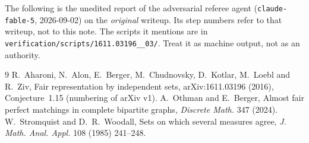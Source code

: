 \documentclass[11pt,a4paper]{article}
\theoremstyle{plain}
\theoremstyle{definition}
\theoremstyle{remark}
\begin{document}
\begin{tcolorbox}[colback=gray!8,colframe=gray!50,boxrule=0.4pt,arc=2pt]
\small The following is the unedited report of the adversarial referee agent (\texttt{claude-fable-5}, 2026-09-02) on the \emph{original} writeup. Its step numbers refer to that writeup, not to this note. The scripts it mentions are in \texttt{verification/scripts/1611.03196\_\_03/}. Treat it as machine output, not as an authority.
\end{tcolorbox}



\begin{thebibliography}{9}
 R.~Aharoni, N.~Alon, E.~Berger, M.~Chudnovsky, D.~Kotlar, M.~Loebl and R.~Ziv, Fair representation by independent sets, arXiv:1611.03196 (2016), Conjecture~1.15 (numbering of arXiv v1).
 A.~Othman and E.~Berger, Almost fair perfect matchings in complete bipartite graphs, \emph{Discrete Math.} 347 (2024).
 W.~Stromquist and D.~R.~Woodall, Sets on which several measures agree, \emph{J. Math. Anal. Appl.} 108 (1985) 241--248.
\end{thebibliography}
\end{document}
